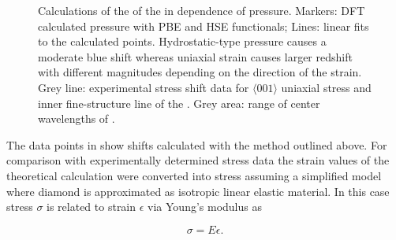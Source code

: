 	\begin{figure}[!htb]
		\centering
		\caption[Calculated dependence between \siv \ZPL and lattice pressure]{Calculations of the \wl of the \siv \ZPL in dependence of pressure. Markers: DFT calculated pressure with PBE and HSE functionals; Lines: linear fits to the calculated points. Hydrostatic-type pressure causes a moderate blue shift whereas uniaxial strain causes larger redshift with different magnitudes depending on the direction of the strain. Grey line: experimental stress shift data for $\langle 001 \rangle$ uniaxial stress and inner fine-structure line of the \siv. Grey area: range of \ZPL center wavelengths of \vl.}
		\label{fig::stress_pressure}
	\end{figure}

	The data points in  show \ZPL \cwl shifts calculated with the method outlined above. For comparison with experimentally determined stress data the strain values of the theoretical calculation were converted into stress assuming a simplified model where diamond is approximated as isotropic linear elastic material. In this case stress $\sigma$ is related to strain $\epsilon$ via Young’s modulus as

	\begin{equation}
		\sigma = E \epsilon .
	\end{equation}

